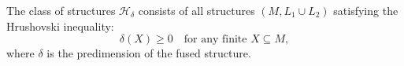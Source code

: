 The class of structures $\mathcal{H}_{\delta}$ consists of all structures $(M, L_1 \cup L_2)$ satisfying the Hrushovski inequality:
$$\delta(X) \geq 0 \quad \text{for any finite } X \subseteq M,$$
where $\delta$ is the predimension of the fused structure.
